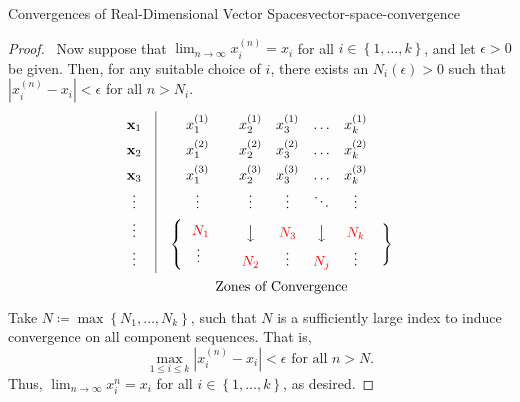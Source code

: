 \documentclass{article}
\renewcommand*\vec{\mathbf}
\newcommand*\iffbackward{\par\boxed\Longleftarrow\ }
\numberwithin{equation}{section}
\numberwithin{figure}{section}
\begin{document}
\begin{theorem}{Convergences of Real-Dimensional Vector
        Spaces}{vector-space-convergence}
\begin{proof}
        \iffbackward Now suppose that $ \lim_{n \to \infty} x_i^{(n)} = x_i $
        for all $ i \in \left\{ 1, \ldots, k \right\} $, and let $ \epsilon > 0
        $ be given. Then, for any suitable choice of $ i $, there exists an $
        N_i(\epsilon) > 0 $ such that $ \left\vert x_i^{(n)} - x_i \right\vert <
        \epsilon $ for all $ n > N_i $.
        \begin{equation*}
            \renewcommand\arraystretch{1.5}
            \begin{matrix}
                \vec{x}_1 & \vline & x_1^{(1)} & x_2^{(1)} & x_3^{(1)} & \ldots
                    & x_k^{(1)} \\
                \vec{x}_2 & \vline & x_1^{(2)} & x_2^{(2)} & x_3^{(2)} & \ldots
                    & x_k^{(2)} \\
                \vec{x}_3 & \vline & x_1^{(3)} & x_2^{(3)} & x_3^{(3)} & \ldots
                    & x_k^{(3)} \\
                \vdots & \vline & \vdots & \vdots & \vdots & \ddots & \vdots \\
                \vdots & \vline & \multirow{2}{*}{$ \begin{cases}
                    ~~\color{red}{N_1} \\ ~~~\vdots \end{cases} $} &
                    \big\downarrow & \color{red}{N_3} &
                    \big\downarrow & \color{red}{N_k} &
                    \multirow{2}{*}{\hspace{-1ex} $ \begin{rcases}
                    \vphantom{~}\\\vphantom{~}\end{rcases} $}
                    \\ %
                \vdots & \vline & & \color{red}{N_2} & \vdots & \color{red}{N_j}
                & \vdots \\ & & \multicolumn{6}{c}{\text{Zones of Convergence}}
            \end{matrix}
        \end{equation*}
        Take $ N \coloneq \max\left\{ N_1, \ldots, N_k \right\} $, such that $ N
        $ is a sufficiently large index to induce convergence on all component
        sequences. That is,
        \begin{equation}
            \max_{1 \leq i \leq k} \left\vert x_i^{(n)} - x_i \right\vert <
            \epsilon \text{ for all } n > N.
        \end{equation}
        Thus, $ \lim_{n \to \infty} x_i^{n} = x_i $ for all $ i \in \left\{ 1,
        \ldots, k \right\} $, as desired.
    \end{proof}
\end{theorem}
\end{document}
